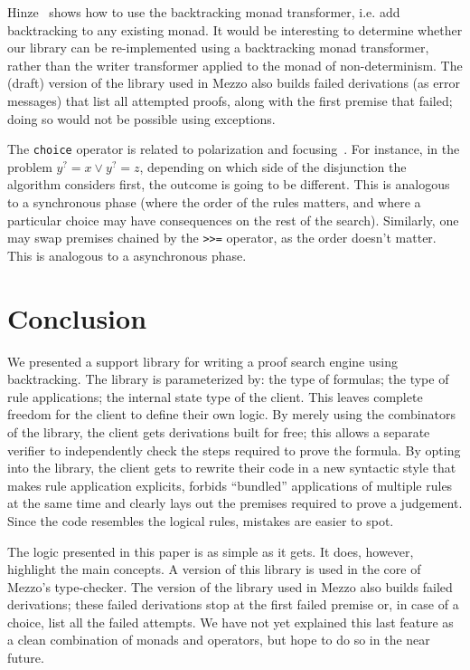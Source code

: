 \documentclass{easychair}
\def\li{\lstinline}
\newcommand{\f}[1]{\ensuremath{#1^?}} %
\begin{document}
Hinze~\cite{hinze-00} shows how to use the backtracking monad transformer, i.e.
add backtracking to any existing monad. It would be interesting to determine
whether our library can be re-implemented using a backtracking monad
transformer, rather than the writer transformer applied to the monad of
non-determinism. The (draft) version of the library used in Mezzo also builds
failed derivations (as error messages) that list all attempted proofs, along
with the first premise that failed; doing so would not be possible using
exceptions.

The \li+choice+ operator is related to polarization and
focusing~\cite{liang-miller-07}. For instance, in the problem $\f y = x \vee \f
y = z$, depending on which side of the disjunction the algorithm considers first,
the outcome is going to be different. This is analogous to a synchronous phase
(where the order of the rules matters, and where a particular choice may have
consequences on the rest of the search). Similarly, one may swap premises
chained by the \li+>>=+ operator, as the order doesn't matter. This is analogous
to a asynchronous phase.

\section{Conclusion}

We presented a support library for writing a proof search engine using
backtracking. The library is parameterized by: the type of formulas; the type of
rule applications; the internal state type of the client. This leaves complete
freedom for the client to define their own logic. By merely using the
combinators of the library, the client gets derivations built for free; this allows
a separate verifier to independently check the steps required to prove the
formula. By opting into the library, the client gets to rewrite their code in a
new syntactic style that makes rule application explicits, forbids ``bundled''
applications of multiple rules at the same time and clearly lays out the
premises required to prove a judgement. Since the code resembles the logical
rules, mistakes are easier to spot.

The logic presented in this paper is as simple as it gets. It does, however,
highlight the main concepts. A version of this library is used in the core of
Mezzo's type-checker. The version of the library used in Mezzo also builds
failed derivations; these failed derivations stop at the first failed premise
or, in case of a choice, list all the failed attempts. We have not yet explained
this last feature as a clean combination of monads and operators, but hope to do
so in the near future.
\end{document}
